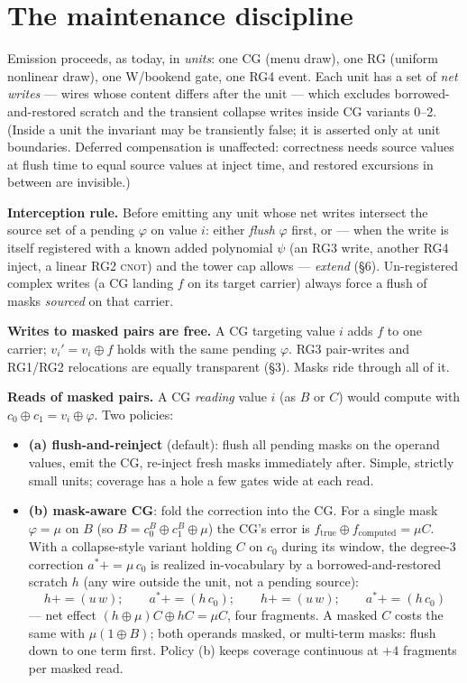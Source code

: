 \documentclass[11pt]{article}
\newcommand{\CNOT}{\textsc{cnot}}
\newcommand{\pe}{\mathrel{{+}{=}}}    %
\begin{document}
\section{The maintenance discipline}\label{sec:disc}

Emission proceeds, as today, in \emph{units}: one CG (menu draw), one RG
(uniform nonlinear draw), one W/bookend gate, one RG4 event. Each unit has
a set of \emph{net writes} --- wires whose content differs after the unit
--- which excludes borrowed-and-restored scratch and the transient
collapse writes inside CG variants 0--2. (Inside a unit the invariant may
be transiently false; it is asserted only at unit boundaries. Deferred
compensation is unaffected: correctness needs source values at flush time
to equal source values at inject time, and restored excursions in between
are invisible.)

\textbf{Interception rule.} Before emitting any unit whose net writes
intersect the source set of a pending $\varphi$ on value $i$: either
\emph{flush} $\varphi$ first, or --- when the write is itself registered
with a known added polynomial $\psi$ (an RG3 write, another RG4 inject, a
linear RG2 \CNOT) and the tower cap allows --- \emph{extend} (\S6).
Un-registered complex writes (a CG landing $f$ on its target carrier)
always force a flush of masks \emph{sourced} on that carrier.

\textbf{Writes to masked pairs are free.} A CG targeting value $i$ adds
$f$ to one carrier; $v_i' = v_i \oplus f$ holds with the same pending
$\varphi$. RG3 pair-writes and RG1/RG2 relocations are equally transparent
(\S3). Masks ride through all of it.

\textbf{Reads of masked pairs.} A CG \emph{reading} value $i$ (as $B$ or
$C$) would compute with $c_0 \oplus c_1 = v_i \oplus \varphi$. Two
policies:

\begin{itemize}
\item \textbf{(a) flush-and-reinject} (default): flush all pending masks
on the operand values, emit the CG, re-inject fresh masks immediately
after. Simple, strictly small units; coverage has a hole a few gates wide
at each read.
\item \textbf{(b) mask-aware CG}: fold the correction into the CG. For a
single mask $\varphi = \mu$ on $B$ (so $B = c_0^B \oplus c_1^B \oplus
\mu$) the CG's error is $f_{\text{true}} \oplus f_{\text{computed}} = \mu
C$. With a collapse-style variant holding $C$ on $c_0$ during its window,
the degree-3 correction $a^* \pe \mu\,c_0$ is realized in-vocabulary by a
borrowed-and-restored scratch $h$ (any wire outside the unit, not a
pending source):
\[
h \pe (u\,w); \qquad a^* \pe (h\,c_0); \qquad h \pe (u\,w);
\qquad a^* \pe (h\,c_0)
\]
--- net effect $(h \oplus \mu)C \oplus hC = \mu C$, four fragments. A
masked $C$ costs the same with $\mu(1 \oplus B)$; both operands masked, or
multi-term masks: flush down to one term first. Policy (b) keeps coverage
continuous at $+4$ fragments per masked read.
\end{itemize}
\end{document}
